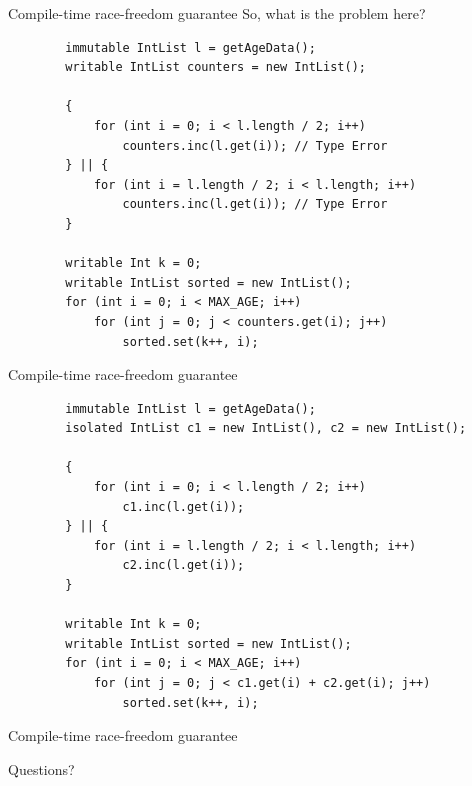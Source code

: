 \documentclass[handout]{beamer} %
\begin{document}
\begin{frame}[fragile]{Compile-time race-freedom guarantee}
	So, what is the problem here?
	\begin{lstlisting}
        immutable IntList l = getAgeData();
        writable IntList counters = new IntList();
        
        {
            for (int i = 0; i < l.length / 2; i++)
                counters.inc(l.get(i)); // Type Error
        } || {
            for (int i = l.length / 2; i < l.length; i++)
                counters.inc(l.get(i)); // Type Error
        }
        
        writable Int k = 0;
        writable IntList sorted = new IntList();
        for (int i = 0; i < MAX_AGE; i++)
            for (int j = 0; j < counters.get(i); j++)
                sorted.set(k++, i);
	\end{lstlisting}
\end{frame}

\begin{frame}[fragile]{Compile-time race-freedom guarantee}
	\begin{lstlisting}
        immutable IntList l = getAgeData();
        isolated IntList c1 = new IntList(), c2 = new IntList();
        
        {
            for (int i = 0; i < l.length / 2; i++)
                c1.inc(l.get(i));
        } || {
            for (int i = l.length / 2; i < l.length; i++)
                c2.inc(l.get(i));
        }
        
        writable Int k = 0;
        writable IntList sorted = new IntList();
        for (int i = 0; i < MAX_AGE; i++)
            for (int j = 0; j < c1.get(i) + c2.get(i); j++)
                sorted.set(k++, i);
	\end{lstlisting}
\end{frame}


\begin{frame}{Compile-time race-freedom guarantee}
	\begin{center}
	\end{center}
\end{frame}


\begin{frame}[focus]
	Questions?
\end{frame}

\end{document}
